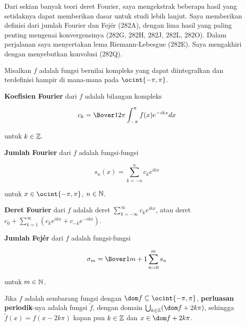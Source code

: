 
\def\chaptername{Analisis Fourier}
\def\sectionname{Deret Fourier}
\def\Var{\mathop{\text{Var}}}


Dari sekian banyak teori deret Fourier, saya mengekstrak beberapa hasil
yang setidaknya dapat memberikan dasar untuk studi lebih lanjut.   Saya memberikan definisi
dari jumlah Fourier dan Fej\'er (282A), dengan lima hasil
yang paling penting mengenai konvergensinya (282G, 282H, 282J, 282L,
282O).   Dalam perjalanan saya menyertakan lema Riemann-Lebesgue (282E).   Saya mengakhiri
dengan menyebutkan konvolusi (282Q).

 Misalkan $f$ adalah fungsi bernilai kompleks
yang dapat diintegralkan dan terdefinisi hampir di mana-mana pada $\ocint{-\pi,\pi}$.

 {\bf Koefisien Fourier} dari $f$ adalah bilangan kompleks

$$c_k=\Bover1{2\pi}\int_{-\pi}^{\pi}f(x)e^{-ikx}dx$$

\noindent untuk $k\in\Bbb Z$.

 {\bf Jumlah Fourier} dari $f$ adalah fungsi-fungsi

$$s_n(x)=\sum_{k=-n}^nc_ke^{ikx}$$

\noindent untuk $x\in\ocint{-\pi,\pi}$, $n\in\Bbb N$.

 {\bf Deret Fourier
} dari $f$ adalah deret $\sum_{k=-\infty}^{\infty}c_ke^{ikx}$,
atau deret
$c_0+\sum_{k=1}^{\infty}(c_ke^{ikx}+c_{-k}e^{-ikx})$.

 {\bf Jumlah Fej\'er} dari $f$ adalah fungsi-fungsi

$$\sigma_m=\Bover1{m+1}\sum_{n=0}^ms_n$$

\noindent untuk $m\in\Bbb N$.

   Jika $f$ adalah
sembarang fungsi dengan $\dom f\subseteq\ocint{-\pi,\pi}$, {\bf perluasan
periodik}-nya adalah fungsi $\tilde f$, dengan domain
$\bigcup_{k\in\Bbb Z}(\dom f+2k\pi)$, sehingga $\tilde f(x)=f(x-2k\pi)$
kapan pun $k\in\Bbb Z$ dan $x\in\dom f+2k\pi$.

